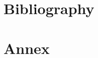 \documentclass[
11pt, %
english, %
doublespacing, %
nolistspacing, %
headsepline, %
consistentlayout, %
]{MastersDoctoralThesis} %
\begin{document}

\mainmatter %
\pagestyle{thesis} %








\chapter{Bibliography}
\clearpage
\printbibliography[heading=none]

\chapter{Annex}
\clearpage










\end{document}
